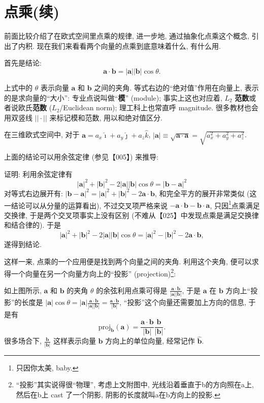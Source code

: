 
\section{点乘(续)}

前面比较介绍了在欧式空间里点乘的规律, 进一步地, 通过抽象化点乘这个概念,
引出了内积. 现在我们来看看两个向量的点乘到底意味着什么, 有什么用.

首先是结论: \[
\boxed{\boldsymbol{a}\cdot\boldsymbol{b}=|\boldsymbol{a}||\boldsymbol{b}|\cos\theta}.
\]

\begin{newquote}
上式中的 \(\theta\) 表示向量 \(\boldsymbol{a}\) 和 \(\boldsymbol{b}\)
之间的夹角. 等式右边的``绝对值''作用在向量上, 表示的是求向量的``大小'':
专业点说叫做``\textbf{模}'' (module); 事实上这也对应着, \(L_2\)
\textbf{范数}或者说欧氏\textbf{范数} (\(L_2\)/Euclidean norm);
理工科上也常直呼 magnitude. 很多教材也会用双竖线 \(||\cdot||\)
来标记模和范数, 用以和绝对值区分.

在三维欧式空间中, 对于
\(\boldsymbol{a}=a_x\hat{\imath}+a_y\hat{\jmath}+a_z\hat{k}\),
\(|\boldsymbol{a}|\equiv\sqrt{\boldsymbol{a}\cdot\boldsymbol{a}}=\sqrt{a_x^2+a_y^2+a_z^2}\).
\end{newquote}

上面的结论可以用余弦定律 (参见【005】) 来推导:

\begin{newquote}
证明: 利用余弦定律有 \[
|\boldsymbol{a}|^2+|\boldsymbol{b}|^2-2|\boldsymbol{a}||\boldsymbol{b}|\cos\theta=|\boldsymbol{b}-\boldsymbol{a}|^2
\] 对等式右边展开有:
\(|\boldsymbol{b}-\boldsymbol{a}|^2=|\boldsymbol{a}|^2+|\boldsymbol{b}|^2-2\boldsymbol{a}\cdot\boldsymbol{b}\),
和完全平方的展开非常类似 (这一结论可以从分量的运算看出),
不过交叉项严格来说
\(-\boldsymbol{a}\cdot\boldsymbol{b}-\boldsymbol{b}\cdot\boldsymbol{a}\),
只因\footnote{只因你太美, baby.}点乘满足交换律,
于是两个交叉项事实上没有区别
(不难从【025】中发现点乘是满足交换律和结合律的). 于是 \[
|\boldsymbol{a}|^2+|\boldsymbol{b}|^2-2|\boldsymbol{a}||\boldsymbol{b}|\cos\theta=|\boldsymbol{a}|^2-|\boldsymbol{b}|^2-2\boldsymbol{a}\cdot\boldsymbol{b},
\] 遂得到结论.
\end{newquote}

这样一来, 点乘的一个应用便是找到两个向量之间的夹角. 利用这个夹角,
便可以求得一个向量在另一个向量方向上的``投影'' (projection)\footnote{``投影''其实说得很``物理'',
  考虑上文附图中, 光线沿着垂直于b的方向照在a上, 然后在b上 cast
  了一个阴影, 阴影的长度就叫a在b方向上的投影.}:

如上图所示, \(\boldsymbol{a}\) 和 \(\boldsymbol{b}\) 的夹角 \(\theta\)
的余弦利用点乘可得是
\(\frac{\boldsymbol{a}\cdot\boldsymbol{b}}{|\boldsymbol{a}||\boldsymbol{b}|}\),
于是 \(\boldsymbol{a}\) 在 \(\boldsymbol{b}\) 方向上``投影''的长度是
\(|\boldsymbol{a}|\cos\theta=|\boldsymbol{a}|\frac{\boldsymbol{a}\cdot\boldsymbol{b}}{|\boldsymbol{a}||\boldsymbol{b}|}=\frac{\boldsymbol{a}\cdot\boldsymbol{b}}{|\boldsymbol{b}|}\),
``投影''这个向量还需要加上方向的信息, 于是有
\[
\mathrm{proj}_{\boldsymbol{b}}(\boldsymbol{a})=\frac{\boldsymbol{a}\cdot\boldsymbol{b}}{|\boldsymbol{b}|}\frac{\boldsymbol{b}}{|\boldsymbol{b}|}.
\]
很多场合下, \(\frac{\boldsymbol{b}}{|\boldsymbol{b}|}\) 这样表示向量
\(\boldsymbol{b}\) 方向上的单位向量, 经常记作 \(\hat{\boldsymbol{b}}\).


